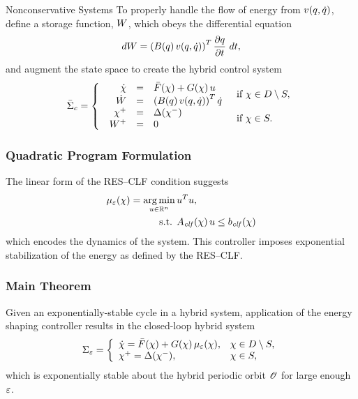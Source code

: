 \begin{frame}[t]
   {
    \begin{block}{Nonconservative Systems}
      To properly handle the flow of energy from $v(q, \dot q)$, define a storage function, $W$,
      which obeys the differential equation
      \begin{align*}
        d\W = \left( \B\argsq \, \vv\argsqdq \right)^{T} \pd{\q}{t} \ dt,
      \end{align*}
      and augment the state space to create the hybrid control system
      \begin{align*}
        \HCSbar = \left\{
          \begin{array}{l l}
            \begin{array}{r c l}
              \hphantom{^{+}}\dx &=& \xfbar\arx + \xg\arx \, \uu\\
              \hphantom{^{+}}\Wdot &=& \left( \B\argsq \, \vv\argsqdq \right)^{T} \dq
            \end{array}  & \mbox{if } \x \in \D \setminus \S,\\
            \begin{array}{r c l}
              \xp &=& \Delta(\xm)\\
              \Wp &=& 0 
            \end{array} & \mbox{if } \x \in \S.
          \end{array}\right.
      \end{align*}
    \end{block}
  }
\end{frame}

\begin{frame}[t]
  \frametitle{Quadratic Program Formulation}
  The linear form of the RES--CLF condition suggests
  \begin{align}
    \nonumber
    \mu_{\varepsilon}(\chi) = \operatorname*{arg\,min}_{u \in \mathbb{R}^{n}}  \, & u^T u,\\
    \mbox{s.t. } & A_{\mathit{clf}}(\chi) \, u \leq b_{\mathit{clf}}(\chi)
  \end{align}
  which encodes the dynamics of the system. This controller imposes exponential
  stabilization of the energy as defined by the RES--CLF.
\end{frame}

\begin{frame}[t]
  \frametitle{Main Theorem}

  \begin{theorem}
    Given an exponentially-stable cycle in a hybrid system, application
    of the energy shaping controller results in the closed-loop hybrid system
    \begin{align*}
      \Sigma_{\varepsilon} = \left\{
        \begin{array}{l l}
          {\dot {\chi}} = {\bar {F}}(\chi) + G(\chi) \, \mu_{\varepsilon}(\chi), & \chi \in D \setminus S,\\
          \chi^{+} = \Delta(\chi^{-}), & \chi \in S,
        \end{array}\right.
    \end{align*}
    which is exponentially stable about the hybrid periodic orbit $\mathscr O$ for
    large enough $\varepsilon$.
    
  \end{theorem}
\end{frame}

